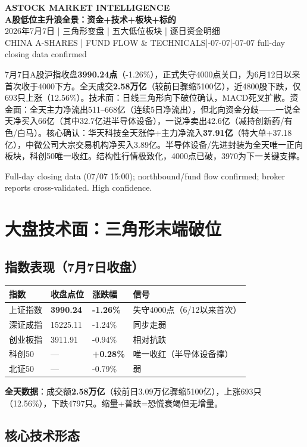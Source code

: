 \documentclass[a4paper,11pt,fontset=none]{ctexart}
\newcommand{\reporttitle}{A股低位主升浪全景：资金+技术+板块+标的}
\newcommand{\reportsubtitle}{2026年7月7日 | 三角形变盘 | 五大低位板块 | 逐日资金明细}
\newcommand{\reportkicker}{ASTOCK MARKET INTELLIGENCE}
\newcommand{\reportscope}{CHINA A-SHARES | FUND FLOW \& TECHNICALS}
\newcommand{\reportdate}{2026-07-07}
\newcommand{\reportdatacutoff}{2026-07-07 full-day closing data confirmed}
\newcommand{\reporthouseview}{%
7月7日A股沪指收盘\textbf{3990.24点}（-1.26\%），正式失守4000点关口，为6月12日以来首次收于4000下方。全天成交\textbf{2.58万亿}（较前日骤缩5100亿），近4800股下跌，仅693只上涨（12.56\%）。技术面：日线三角形向下破位确认，MACD死叉扩散。资金面：全天主力净流出511--668亿（连续5日净流出），但北向资金分歧——一说全天净买入66亿（其中32.7亿进半导体设备），一说净卖出42.6亿（减持创新药/有色/白马）。核心确认：华天科技全天涨停+主力净流入\textbf{37.91亿}（特大单+37.18亿），中微公司大宗交易机构净买入3.89亿。半导体设备/先进封装为全天唯一正向板块，科创50唯一收红。结构性行情极致化，4000点已破，3970为下一关键支撑。%
}
\newcommand{\reportquality}{Full-day closing data (07/07 15:00); northbound/fund flow confirmed; broker reports cross-validated. High confidence.}
\begin{document}
\begin{center}
{\sffamily\small\bfseries\color{steelgrey} \reportkicker}\\[3pt]
{\LARGE\bfseries\color{navy} \reporttitle}\\[5pt]
{\large\color{steelgrey} \reportsubtitle}\\[4pt]
{\small\color{mutedgrey} \reportscope \quad|\quad \reportdate \quad|\quad \reportdatacutoff}
\end{center}
\vspace{0.7em}

\begin{dashboardbox}
\begin{houseviewbox}
\reporthouseview
\end{houseviewbox}
\begin{sourcequalitybox}
\reportquality
\end{sourcequalitybox}
\end{dashboardbox}

\section{大盘技术面：三角形末端破位}

\subsection*{指数表现（7月7日收盘）}

\begin{tabularx}{\textwidth}{L{3cm}L{2.5cm}L{2cm}X}
\toprule
\textbf{指数} & \textbf{收盘点位} & \textbf{涨跌幅} & \textbf{信号} \\
\midrule
上证指数 & \textbf{3990.24} & \textbf{-1.26\%} & 失守4000点（6/12以来首次） \\
深证成指 & 15225.11 & -1.24\% & 同步走弱 \\
创业板指 & 3911.91 & -0.94\% & 相对抗跌 \\
科创50 & --- & \textbf{+0.28\%} & 唯一收红（半导体设备撑） \\
北证50 & --- & -0.79\% & 弱 \\
\bottomrule
\end{tabularx}

\textbf{全天数据}：成交额\textbf{2.58万亿}（较前日3.09万亿骤缩5100亿），上涨693只（12.56\%），下跌4797只。缩量+普跌=恐慌衰竭但无增量。

\subsection*{核心技术形态}
\end{document}

